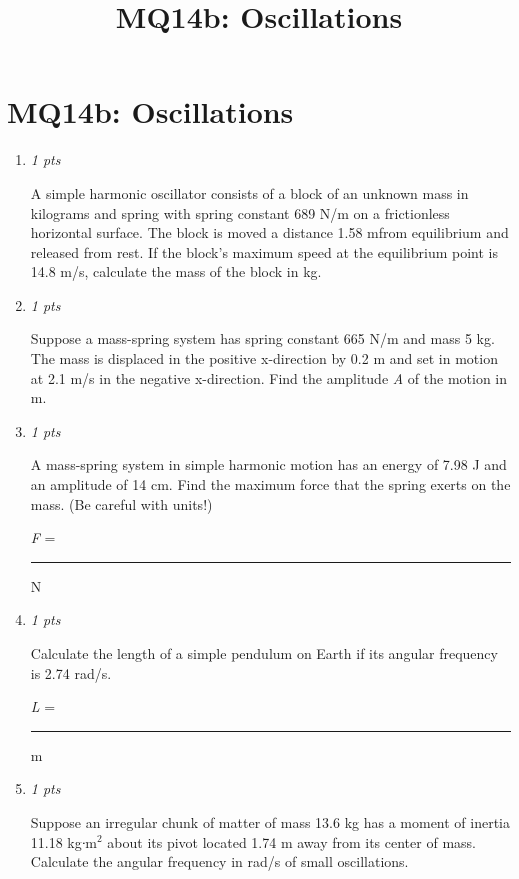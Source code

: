 \documentclass[11pt]{article}
\title{MQ14b: Oscillations}
\author{}
\date{}
\begin{document}
\maketitle

\section*{MQ14b: Oscillations}

\begin{enumerate}[leftmargin=*,label=\textbf{Question \arabic*.}]
\item \hfill \textit{1 pts}

A simple harmonic oscillator consists of a block of an unknown mass in kilograms and spring with spring constant 689 N/m on a frictionless horizontal surface. The block is moved a distance 1.58 mfrom equilibrium and released from rest. If the block's maximum speed at the equilibrium point is 14.8 m/s, calculate the mass of the block in kg.

\item \hfill \textit{1 pts}

Suppose a mass-spring system has spring constant 665 N/m and mass 5 kg. The mass is displaced in the positive x-direction by 0.2 m and set in motion at 2.1 m/s in the negative x-direction. Find the amplitude \emph{A} of the motion in m.

\item \hfill \textit{1 pts}

A mass-spring system in simple harmonic motion has an energy of 7.98 J and an amplitude of 14 cm. Find the maximum force that the spring exerts on the mass. (Be careful with units!)



\emph{F }= \rule{2cm}{0.4pt} N

\item \hfill \textit{1 pts}

Calculate the length of a simple pendulum on Earth if its angular frequency is 2.74 rad/s.



 \emph{L} = \rule{2cm}{0.4pt} m

\item \hfill \textit{1 pts}

Suppose an irregular chunk of matter of mass 13.6 kg has a moment of inertia 11.18 kgᐧm$^{2}$ about its pivot located 1.74 m away from its center of mass. Calculate the angular frequency in rad/s of small oscillations.

\end{enumerate}
\end{document}
